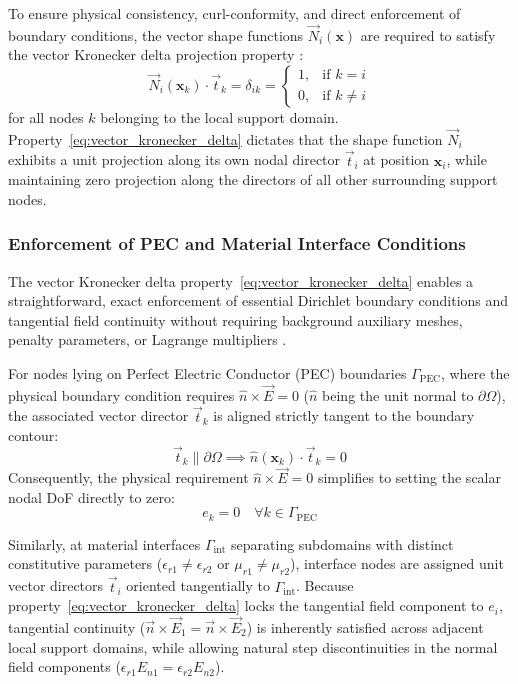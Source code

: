 \documentclass[preprint,12pt]{elsarticle}
\begin{document}
To ensure physical consistency, curl-conformity, and direct enforcement of boundary conditions, the vector shape functions $\vec{N}_i(\mathbf{x})$ are required to satisfy the vector Kronecker delta projection property \cite{lima2017edge, ortiz2021nodal}:
\begin{equation}
\vec{N}_i(\mathbf{x}_k) \cdot \vec{t}_k = \delta_{ik} = \begin{cases} 1, & \text{if } k = i \\ 0, & \text{if } k \neq i \end{cases}
\label{eq:vector_kronecker_delta}
\end{equation}
for all nodes $k$ belonging to the local support domain. Property~\eqref{eq:vector_kronecker_delta} dictates that the shape function $\vec{N}_i$ exhibits a unit projection along its own nodal director $\vec{t}_i$ at position $\mathbf{x}_i$, while maintaining zero projection along the directors of all other surrounding support nodes.

\subsubsection{Enforcement of PEC and Material Interface Conditions}
The vector Kronecker delta property~\eqref{eq:vector_kronecker_delta} enables a straightforward, exact enforcement of essential Dirichlet boundary conditions and tangential field continuity without requiring background auxiliary meshes, penalty parameters, or Lagrange multipliers \cite{goncalves2023vector, ortiz2021nodal}.

For nodes lying on Perfect Electric Conductor (PEC) boundaries $\Gamma_{\text{PEC}}$, where the physical boundary condition requires $\hat{n} \times \vec{E} = 0$ ($\hat{n}$ being the unit normal to $\partial\Omega$), the associated vector director $\vec{t}_k$ is aligned strictly tangent to the boundary contour:
\begin{equation}
\vec{t}_k \parallel \partial\Omega \implies \hat{n}(\mathbf{x}_k) \cdot \vec{t}_k = 0
\end{equation}
Consequently, the physical requirement $\hat{n} \times \vec{E} = 0$ simplifies to setting the scalar nodal DoF directly to zero:
\begin{equation}
e_k = 0 \quad \forall k \in \Gamma_{\text{PEC}}
\label{eq:pec_dirichlet_homog}
\end{equation}

Similarly, at material interfaces $\Gamma_{\text{int}}$ separating subdomains with distinct constitutive parameters ($\epsilon_{r1} \neq \epsilon_{r2}$ or $\mu_{r1} \neq \mu_{r2}$), interface nodes are assigned unit vector directors $\vec{t}_i$ oriented tangentially to $\Gamma_{\text{int}}$. Because property~\eqref{eq:vector_kronecker_delta} locks the tangential field component to $e_i$, tangential continuity ($\vec{n} \times \vec{E}_1 = \vec{n} \times \vec{E}_2$) is inherently satisfied across adjacent local support domains, while allowing natural step discontinuities in the normal field components ($\epsilon_{r1} E_{n1} = \epsilon_{r2} E_{n2}$).
\end{document}
